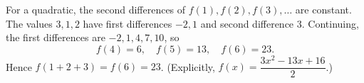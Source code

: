 For a quadratic, the second differences of $f(1),f(2),f(3),\dots$ are constant. The values $3,1,2$ have first differences $-2,1$ and second difference $3$. Continuing, the first differences are $-2,1,4,7,10$, so
\[f(4)=6,\quad f(5)=13,\quad f(6)=23.\]
Hence $f(1+2+3)=f(6)=\boxed{23}$. (Explicitly, $f(x)=\dfrac{3x^2-13x+16}{2}$.)
